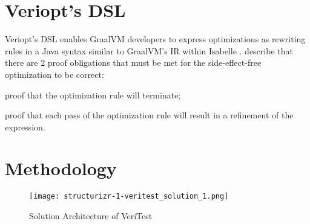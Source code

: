 \documentclass[conference,a4paper,english,10pt]{IEEEtran}[2015/08/26]
\begin{document}



\section{Veriopt's DSL}
\label{sec:dsl}

Veriopt's DSL enables GraalVM developers to express optimizations as rewriting rules in a Java syntax similar to GraalVM's IR within Isabelle 
\cite{Term_Graph_Optimizations}. \citet{Term_Graph_Optimizations} describe that there are 2 proof obligations that must be met for the 
side-effect-free optimization to be correct: 
\begin{inparaenum}
  \item proof that the optimization rule will terminate;
  \item proof that each pass of the optimization rule will result in a refinement of the expression.
\end{inparaenum}

\section{Methodology}
\label{sec:Methodology}

\begin{figure*}
  \centering
  \texttt{[image: structurizr-1-veritest\_solution\_1.png]}
  \caption{Solution Architecture of VeriTest}
  \label{fig:architecture}
\end{figure*}
\end{document}
